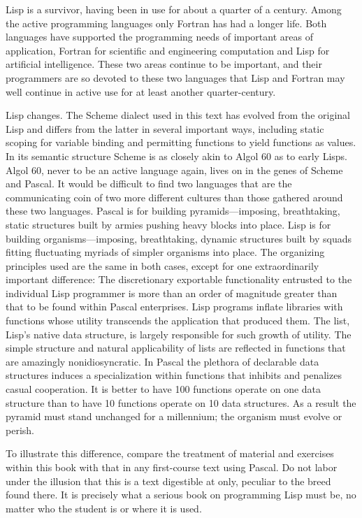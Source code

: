 Lisp is a survivor, having been in use for about a quarter of a century.  Among
the active programming languages only Fortran has had a longer life.  Both
languages have supported the programming needs of important areas of
application, Fortran for scientific and engineering computation and Lisp for
artificial intelligence.  These two areas continue to be important, and their
programmers are so devoted to these two languages that Lisp and Fortran may
well continue in active use for at least another quarter-century.

Lisp changes.  The Scheme dialect used in this text has evolved from the
original Lisp and differs from the latter in several important ways, including
static scoping for variable binding and permitting functions to yield functions
as values.  In its semantic structure Scheme is as closely akin to Algol 60 as
to early Lisps.  Algol 60, never to be an active language again, lives on in
the genes of Scheme and Pascal.  It would be difficult to find two languages
that are the communicating coin of two more different cultures than those
gathered around these two languages.  Pascal is for building
pyramids---imposing, breathtaking, static structures built by armies pushing
heavy blocks into place.  Lisp is for building organisms---imposing,
breathtaking, dynamic structures built by squads fitting fluctuating myriads of
simpler organisms into place.  The organizing principles used are the same in
both cases, except for one extraordinarily important difference: The
discretionary exportable functionality entrusted to the individual Lisp
programmer is more than an order of magnitude greater than that to be found
within Pascal enterprises.  Lisp programs inflate libraries with functions
whose utility transcends the application that produced them.  The list, Lisp's
native data structure, is largely responsible for such growth of utility.  The
simple structure and natural applicability of lists are reflected in functions
that are amazingly nonidiosyncratic.  In Pascal the plethora of declarable data
structures induces a specialization within functions that inhibits and
penalizes casual cooperation.  It is better to have 100 functions operate on
one data structure than to have 10 functions operate on 10 data structures.  As
a result the pyramid must stand unchanged for a millennium; the organism must
evolve or perish.

To illustrate this difference, compare the treatment of material and exercises
within this book with that in any first-course text using Pascal.  Do not labor
under the illusion that this is a text digestible at  only,
peculiar to the breed found there.  It is precisely what a serious book on
programming Lisp must be, no matter who the student is or where it is used.

